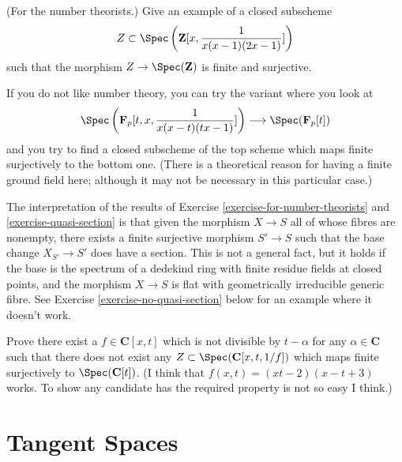 \begin{exercise}
\label{exercise-for-number-theorists}
(For the number theorists.) Give an example of a closed subscheme
$$
Z \subset \Spec\left({\mathbf Z}[x, \frac{1 }{ x(x-1)(2x-1)}]\right)
$$
such that the morphism $Z \to \Spec({\mathbf Z})$ is finite
and surjective.
\end{exercise}

\begin{exercise}
\label{exercise-quasi-section}
If you do not like number theory, you can try the
variant where you look at
$$
\Spec\left({\mathbf F}_p[t, x, \frac{1 }{ x(x-t)(tx-1)}]\right)
\longrightarrow
\Spec({\mathbf F}_p[t])
$$
and you try to find a closed subscheme of the top scheme
which maps finite surjectively to the bottom one. (There is a
theoretical reason for having a finite ground field here; although
it may not be necessary in this particular case.)
\end{exercise}

\begin{remark}
\label{remark-interpretation-skolem-noether}
The interpretation of the results of
Exercise \ref{exercise-for-number-theorists} and \ref{exercise-quasi-section}
is that given the morphism $X \to S$ all of whose fibres are nonempty,
there exists a finite surjective morphism $S' \to S$ such that
the base change $X_{S'} \to S'$ does have a section.
This is not a general fact, but it holds if the base is the spectrum of a
dedekind ring with finite residue fields at closed points, and
the morphism $X \to S$ is flat with geometrically irreducible generic
fibre. See Exercise \ref{exercise-no-quasi-section} below for an example
where it doesn't work.
\end{remark}

\begin{exercise}
\label{exercise-no-quasi-section}
Prove there exist a $f \in \mathbf{C}[x, t]$ which is not divisible
by $t - \alpha$ for any $\alpha \in \mathbf{C}$ such that
there does not exist any $Z \subset \Spec(\mathbf{C}[x, t, 1/f])$
which maps finite surjectively to $\Spec(\mathbf{C}[t])$.
(I think that $f(x, t) = (xt - 2)(x - t + 3)$ works. To show any candidate
has the required property is not so easy I think.)
\end{exercise}


\section{Tangent Spaces}
\label{section-tangent-space}

